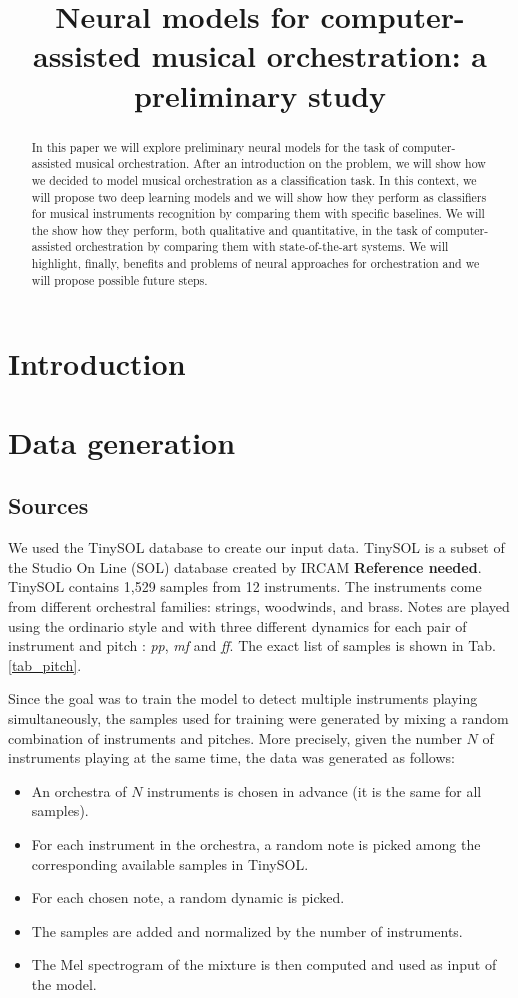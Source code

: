 \documentclass{article}
\title{Neural models for computer-assisted musical orchestration: a preliminary study}
\begin{document}
%
\maketitle
%
\begin{abstract}
In this paper we will explore preliminary neural models for the task of computer-assisted musical orchestration. After an introduction on the problem, we will show how we decided to model musical orchestration as a classification task. In this context, we will propose two deep learning models and we will show how they perform as classifiers for musical instruments recognition by comparing them with specific baselines. We will the show how they perform, both qualitative and quantitative, in the task of computer-assisted orchestration by comparing them with state-of-the-art systems. We will highlight, finally, benefits and problems of neural approaches for orchestration and we will propose possible future steps.
\end{abstract}
%
\section{Introduction}\label{sec:introduction}

\section{Data generation}

\subsection{Sources}
We used the TinySOL database to create our input data. TinySOL is a subset of the Studio On Line (SOL) database created by IRCAM \textbf{Reference needed}. TinySOL contains 1,529 samples from 12 instruments. The instruments come from different orchestral families: strings, woodwinds, and brass. Notes are played using the ordinario style and with three different dynamics for each pair of instrument and pitch : \textit{pp}, \textit{mf} and \textit{ff}. The exact list of samples is shown in Tab.\ref{tab_pitch}. 

Since the goal was to train the model to detect multiple instruments playing simultaneously, the samples used for training were generated by mixing a random combination of instruments and pitches. More precisely, given the number $N$ of instruments playing at the same time, the data was generated as follows:

\begin{itemize}
\item An orchestra of $N$ instruments is chosen in advance (it is the same for all samples).
\item For each instrument in the orchestra, a random note is picked among the corresponding available samples in TinySOL.
\item For each chosen note, a random dynamic is picked.
\item The samples are added and normalized by the number of instruments.
\item The Mel spectrogram of the mixture is then computed and used as input of the model.
\end{itemize}
\end{document}
